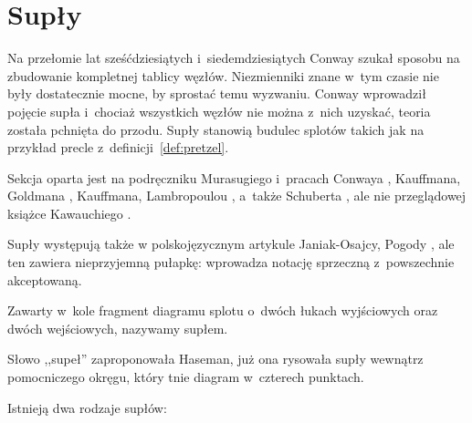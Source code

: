 
\section{Supły}
%
\label{sec:tangle}%
Na przełomie lat sześćdziesiątych i~siedemdziesiątych Conway szukał sposobu na zbudowanie kompletnej tablicy węzłów.
Niezmienniki znane w~tym czasie nie były dostatecznie mocne, by sprostać temu wyzwaniu.
Conway wprowadził pojęcie supła i~chociaż wszystkich węzłów nie można z~nich uzyskać, teoria została pchnięta do przodu.
Supły stanowią budulec splotów takich jak na przykład precle z~definicji~\ref{def:pretzel}.

Sekcja oparta jest na podręczniku Murasugiego \cite{murasugi1996} i~pracach Conwaya \cite{conway1970}, Kauffmana, Goldmana \cite{kauffman1997}, Kauffmana, Lambropoulou \cite{kauffman2004}, a~także Schuberta \cite{schubert1956}, ale nie przeglądowej książce Kawauchiego \cite[s. 34-36]{kawauchi1996}.
%
%
%
%
%

Supły występują także w polskojęzycznym artykule Janiak-Osajcy, Pogody \cite{janiak2004}, ale ten zawiera nieprzyjemną pułapkę: wprowadza notację sprzeczną z~powszechnie akceptowaną.
%
%

\begin{definition}[supeł]
    \label{def:tangle}
    Zawarty w~kole fragment diagramu splotu o~dwóch łukach wyjściowych oraz dwóch wejściowych, nazywamy supłem.
\end{definition}

Słowo ,,supeł'' zaproponowała Haseman, już ona rysowała supły wewnątrz pomocniczego okręgu, który tnie diagram w~czterech punktach.
%

Istnieją dwa rodzaje supłów:
\begin{comment}
\begin{figure}[H]
    \centering
    \begin{minipage}[b]{.48\linewidth}
        \[\LargeTangleAlternatingYes\]
        \subcaption{supeł naprzemienny}
    \end{minipage}
    \begin{minipage}[b]{.48\linewidth}
        \centering
        \[\LargeTangleAlternatingNo\]
        \subcaption{supeł sąsiądujący}
    \end{minipage}
\end{figure}
\end{comment}

